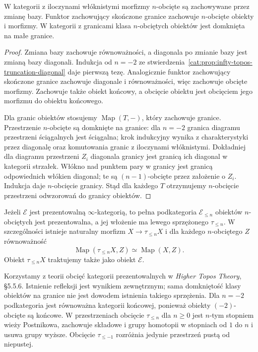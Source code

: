 \begin{wniosek}\label{cat:cor:infty-topos-truncated-stability}
W kategorii z iloczynami włóknistymi morfizmy $n$-obcięte są zachowywane przez zmianę bazy. Funktor zachowujący skończone granice zachowuje $n$-obcięte obiekty i morfizmy. W kategorii z granicami klasa $n$-obciętych obiektów jest domknięta na małe granice.
\end{wniosek}
\begin{proof}
Zmiana bazy zachowuje równoważności, a diagonala po zmianie bazy jest zmianą bazy diagonali. Indukcja od $n=-2$ ze stwierdzenia~\ref{cat:prop:infty-topos-truncation-diagonal} daje pierwszą tezę. Analogicznie funktor zachowujący skończone granice zachowuje diagonale i równoważności, więc zachowuje obcięte morfizmy. Zachowuje także obiekt końcowy, a obcięcie obiektu jest obcięciem jego morfizmu do obiektu końcowego.

Dla granic obiektów stosujemy $\operatorname{Map}(T,-)$, który zachowuje granice. Przestrzenie $n$-obcięte są domknięte na granice: dla $n=-2$ granica diagramu przestrzeni ściągalnych jest ściągalna; krok indukcyjny wynika z charakterystyki przez diagonalę oraz komutowania granic z iloczynami włóknistymi. Dokładniej dla diagramu przestrzeni $Z_i$ diagonala granicy jest granicą ich diagonal w kategorii strzałek. Włókno nad punktem pary w granicy jest granicą odpowiednich włókien diagonal; te są $(n-1)$-obcięte przez założenie o $Z_i$. Indukcja daje $n$-obcięcie granicy. Stąd dla każdego $T$ otrzymujemy $n$-obcięcie przestrzeni odwzorowań do granicy obiektów.
\end{proof}

\begin{twierdzenie}\label{cat:thm:infty-topos-truncation}
Jeżeli $\mathcal E$ jest prezentowalną $\infty$-kategorią, to pełna podkategoria $\mathcal E_{\leq n}$ obiektów $n$-obciętych jest prezentowalna, a jej włożenie ma lewego sprzężonego $\tau_{\leq n}$. W szczególności istnieje naturalny morfizm $X\to\tau_{\leq n}X$ i dla każdego $n$-obciętego $Z$ równoważność
\[
 \operatorname{Map}(\tau_{\leq n}X,Z)\simeq\operatorname{Map}(X,Z).
\]
Obiekt $\tau_{\leq n}X$ traktujemy także jako obiekt $\mathcal E$.
\end{twierdzenie}

Korzystamy z teorii obcięć kategorii prezentowalnych w \emph{Higher Topos Theory}, \S5.5.6. Istnienie refleksji jest wynikiem zewnętrznym; sama domkniętość klasy obiektów na granice nie jest dowodem istnienia takiego sprzężenia. Dla $n=-2$ podkategoria jest równoważna kategorii końcowej, ponieważ obiekty $(-2)$-obcięte są końcowe. W przestrzeniach obcięcie $\tau_{\leq n}$ dla $n\geq0$ jest $n$-tym stopniem wieży Postnikowa, zachowuje składowe i grupy homotopii w stopniach od $1$ do $n$ i usuwa grupy wyższe. Obcięcie $\tau_{\leq-1}$ rozróżnia jedynie przestrzeń pustą od niepustej.

